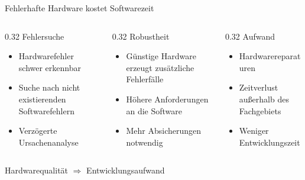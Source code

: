 \documentclass[aspectratio=169]{beamer}
\begin{document}
	\begin{frame}{Fehlerhafte Hardware kostet Softwarezeit}

		\begin{columns}[T]

		\begin{column}{0.32\textwidth}
		\centering
		\Large Fehlersuche

		\vspace{0.5em}

		\small
		\begin{itemize}
			\item Hardwarefehler schwer erkennbar
			\item Suche nach nicht existierenden Softwarefehlern
			\item Verzögerte Ursachenanalyse
		\end{itemize}
		\end{column}

		\begin{column}{0.32\textwidth}
		\centering
		\Large Robustheit

		\vspace{0.5em}

		\small
		\begin{itemize}
			\item Günstige Hardware erzeugt zusätzliche Fehlerfälle
			\item Höhere Anforderungen an die Software
			\item Mehr Absicherungen notwendig
		\end{itemize}
		\end{column}

		\begin{column}{0.32\textwidth}
		\centering
		\Large Aufwand

		\vspace{0.5em}

		\small
		\begin{itemize}
			\item Hardwarereparaturen
			\item Zeitverlust außerhalb des Fachgebiets
			\item Weniger Entwicklungszeit 
		\end{itemize}
		\end{column}

		\end{columns}

		\vfill

		\centering
		\Large
		Hardwarequalität $\Rightarrow$ Entwicklungsaufwand

	\end{frame}
\end{document}
